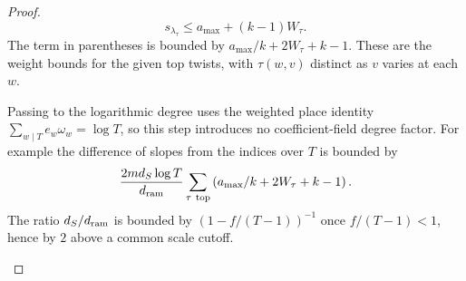 \begin{proof}
\[
  s_{\lambda_\tau}\le a_{\max}+(k-1)W_\tau.
\]
The term in parentheses is bounded by
\(a_{\max}/k+2W_\tau+k-1\). These are the weight
bounds for the given top twists, with \(\tau(w,v)\)
distinct as \(v\) varies at each \(w\).

Passing to the logarithmic degree uses the weighted
place identity \(\sum_{w\mid T}e_w\omega_w=\log T\),
so this step introduces no coefficient-field degree
factor. For example the difference of slopes from the
indices over \(T\) is bounded by
\[
 \frac{2m d_S\log T}{d_{\rm ram}}
     \sum_{\tau\ {\rm top}}
                  \left(a_{\max}/k+2W_\tau+k-1\right).
\]
The ratio \(d_S/d_{\rm ram}\) is bounded by
\((1-f/(T-1))^{-1}\) once \(f/(T-1)<1\), hence
by \(2\) above a common scale cutoff.


\label{cor:ramified-column-1}
\end{proof}
